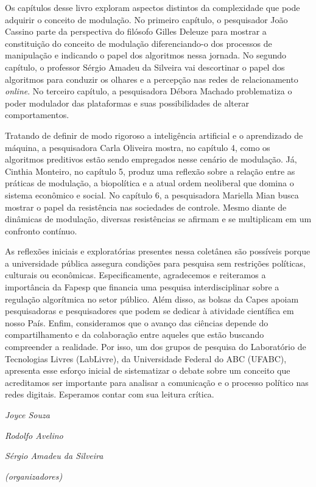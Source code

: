 Os capítulos desse livro exploram aspectos distintos da complexidade que
pode adquirir o conceito de modulação. No primeiro capítulo, o
pesquisador João Cassino parte da perspectiva do filósofo Gilles Deleuze
para mostrar a constituição do conceito de modulação diferenciando-o dos
processos de manipulação e indicando o papel dos algoritmos nessa
jornada. No segundo capítulo, o professor Sérgio Amadeu da Silveira vai
descortinar o papel dos algoritmos para conduzir os olhares e a
percepção nas redes de relacionamento \emph{online}. No terceiro
capítulo, a pesquisadora Débora Machado problematiza o poder modulador
das plataformas e suas possibilidades de alterar comportamentos.

Tratando de definir de modo rigoroso a inteligência artificial e o
aprendizado de máquina, a pesquisadora Carla Oliveira mostra, no
capítulo 4, como os algoritmos preditivos estão sendo empregados nesse
cenário de modulação. Já, Cinthia Monteiro, no capítulo 5, produz uma
reflexão sobre a relação entre as práticas de modulação, a biopolítica e
a atual ordem neoliberal que domina o sistema econômico e social. No
capítulo 6, a pesquisadora Mariella Mian busca mostrar o papel da
resistência nas sociedades de controle. Mesmo diante de dinâmicas de
modulação, diversas resistências se afirmam e se multiplicam em um
confronto contínuo.

As reflexões iniciais e exploratórias presentes nessa coletânea são
possíveis porque a universidade pública assegura condições para pesquisa
sem restrições políticas, culturais ou econômicas. Especificamente,
agradecemos e reiteramos a importância da Fapesp que financia uma
pesquisa interdisciplinar sobre a regulação algorítmica no setor
público. Além disso, as bolsas da Capes apoiam pesquisadoras e
pesquisadores que podem se dedicar à atividade científica em nosso País.
Enfim, consideramos que o avanço das ciências depende do
compartilhamento e da colaboração entre aqueles que estão buscando
compreender a realidade. Por isso, um dos grupos de pesquisa do
Laboratório de Tecnologias Livres (LabLivre), da Universidade Federal do ABC
(UFABC), apresenta esse esforço inicial de sistematizar o debate sobre um
conceito que acreditamos ser importante para analisar a comunicação e o
processo político nas redes digitais. Esperamos contar com sua leitura
crítica.

\begin{flushright}
\emph{Joyce Souza}

\emph{Rodolfo Avelino}

\emph{Sérgio Amadeu da Silveira}

\emph{(organizadores)}
\end{flushright}
